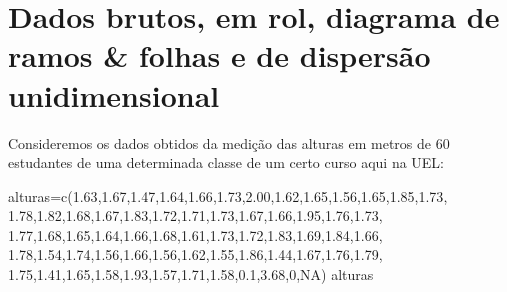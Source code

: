 \documentclass[
]{book}
\newenvironment{Shaded}{\begin{snugshade}}{\end{snugshade}}
\newcommand{\ConstantTok}[1]{\textcolor[rgb]{0.00,0.00,0.00}{#1}}
\newcommand{\DecValTok}[1]{\textcolor[rgb]{0.00,0.00,0.81}{#1}}
\newcommand{\FloatTok}[1]{\textcolor[rgb]{0.00,0.00,0.81}{#1}}
\newcommand{\FunctionTok}[1]{\textcolor[rgb]{0.00,0.00,0.00}{#1}}
\newcommand{\NormalTok}[1]{#1}
\newcommand{\OtherTok}[1]{\textcolor[rgb]{0.56,0.35,0.01}{#1}}
\begin{document}
\hypertarget{dados-brutos-em-rol-diagrama-de-ramos-folhas-e-de-dispersuxe3o-unidimensional}{%
\section{Dados brutos, em rol, diagrama de ramos \& folhas e de dispersão unidimensional}\label{dados-brutos-em-rol-diagrama-de-ramos-folhas-e-de-dispersuxe3o-unidimensional}}

Consideremos os dados obtidos da medição das alturas em metros de 60 estudantes de uma determinada classe de um certo curso aqui na UEL:

\begin{Shaded}
\begin{Highlighting}[]
\NormalTok{alturas}\OtherTok{=}\FunctionTok{c}\NormalTok{(}\FloatTok{1.63}\NormalTok{,}\FloatTok{1.67}\NormalTok{,}\FloatTok{1.47}\NormalTok{,}\FloatTok{1.64}\NormalTok{,}\FloatTok{1.66}\NormalTok{,}\FloatTok{1.73}\NormalTok{,}\FloatTok{2.00}\NormalTok{,}\FloatTok{1.62}\NormalTok{,}\FloatTok{1.65}\NormalTok{,}\FloatTok{1.56}\NormalTok{,}\FloatTok{1.65}\NormalTok{,}\FloatTok{1.85}\NormalTok{,}\FloatTok{1.73}\NormalTok{,}
          \FloatTok{1.78}\NormalTok{,}\FloatTok{1.82}\NormalTok{,}\FloatTok{1.68}\NormalTok{,}\FloatTok{1.67}\NormalTok{,}\FloatTok{1.83}\NormalTok{,}\FloatTok{1.72}\NormalTok{,}\FloatTok{1.71}\NormalTok{,}\FloatTok{1.73}\NormalTok{,}\FloatTok{1.67}\NormalTok{,}\FloatTok{1.66}\NormalTok{,}\FloatTok{1.95}\NormalTok{,}\FloatTok{1.76}\NormalTok{,}\FloatTok{1.73}\NormalTok{,}
          \FloatTok{1.77}\NormalTok{,}\FloatTok{1.68}\NormalTok{,}\FloatTok{1.65}\NormalTok{,}\FloatTok{1.64}\NormalTok{,}\FloatTok{1.66}\NormalTok{,}\FloatTok{1.68}\NormalTok{,}\FloatTok{1.61}\NormalTok{,}\FloatTok{1.73}\NormalTok{,}\FloatTok{1.72}\NormalTok{,}\FloatTok{1.83}\NormalTok{,}\FloatTok{1.69}\NormalTok{,}\FloatTok{1.84}\NormalTok{,}\FloatTok{1.66}\NormalTok{,}
          \FloatTok{1.78}\NormalTok{,}\FloatTok{1.54}\NormalTok{,}\FloatTok{1.74}\NormalTok{,}\FloatTok{1.56}\NormalTok{,}\FloatTok{1.66}\NormalTok{,}\FloatTok{1.56}\NormalTok{,}\FloatTok{1.62}\NormalTok{,}\FloatTok{1.55}\NormalTok{,}\FloatTok{1.86}\NormalTok{,}\FloatTok{1.44}\NormalTok{,}\FloatTok{1.67}\NormalTok{,}\FloatTok{1.76}\NormalTok{,}\FloatTok{1.79}\NormalTok{,}
          \FloatTok{1.75}\NormalTok{,}\FloatTok{1.41}\NormalTok{,}\FloatTok{1.65}\NormalTok{,}\FloatTok{1.58}\NormalTok{,}\FloatTok{1.93}\NormalTok{,}\FloatTok{1.57}\NormalTok{,}\FloatTok{1.71}\NormalTok{,}\FloatTok{1.58}\NormalTok{,}\FloatTok{0.1}\NormalTok{,}\FloatTok{3.68}\NormalTok{,}\DecValTok{0}\NormalTok{,}\ConstantTok{NA}\NormalTok{)}
\NormalTok{alturas}
\end{Highlighting}
\end{Shaded}
\end{document}
